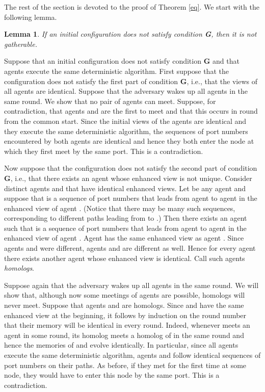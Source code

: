 \documentclass[11pt]{article}
\newtheorem{lemma}{Lemma}[section]
\newcommand{\qed}{\hfill  \bigbreak}
\newenvironment{proof}{\noindent {\bf Proof.}}{\qed}
\begin{document}
The rest of the section is devoted to the proof of Theorem \ref{eq}.
We start with the following lemma.

\begin{lemma}\label{not}
If an initial configuration does not satisfy condition {\bf G}, then it is not gatherable.
\end{lemma}

\begin{proof}
Suppose that an initial configuration  does not satisfy condition {\bf G} and that agents execute the same deterministic algorithm.
First suppose that the configuration  does not satisfy the first part of condition  {\bf G}, i.e., that the views of all agents are identical.
Suppose that the adversary wakes up all agents in the same round. We show that no pair of agents can meet. Suppose, for contradiction, that 
agents  and  are the first to meet and that this occurs in round  from the common start. Since the initial views of the agents are identical
and they execute the same deterministic algorithm, the sequences of port numbers encountered by both agents are identical and hence they both
enter the node at which they first meet by the same port. This is a contradiction.

Now suppose that the configuration  does not satisfy the second part of condition  {\bf G}, i.e., that there exists an agent whose enhanced view is not unique. 
Consider distinct agents
 and  that have identical enhanced views. Let  be any agent and suppose that   is a sequence of port numbers that leads
from agent  to agent  in the enhanced view of agent . (Notice that there may be many such sequences, corresponding to different paths 
leading from  to .) Then there exists an agent  such that  is a sequence of port numbers that leads
from agent  to agent  in the enhanced view of agent . Agent  has the same enhanced view as agent . 
Since agents  and  were different, agents  and  are different as well. Hence for every agent there exists another agent whose enhanced view
is identical. Call such agents {\em homologs}.

Suppose again that the adversary wakes up all agents in the same round. We will show that, although now some meetings of agents are possible, homologs will
never meet. Suppose that agents  and  are homologs. Since  and  have the same enhanced view at the beginning, it follows by induction
on the round number that their memory will be identical in every round. Indeed, whenever  meets an agent  in some round, its homolog  meets
a homolog  of  in the same round and hence the memories of  and  evolve identically. In particular, since all agents execute the same
deterministic algorithm, agents  and  follow identical sequences of port numbers on their paths. As before, if they met for the first time at some node, they
would have to enter this node by the same port. This is a contradiction.
 \end{proof}
 
\end{document}
